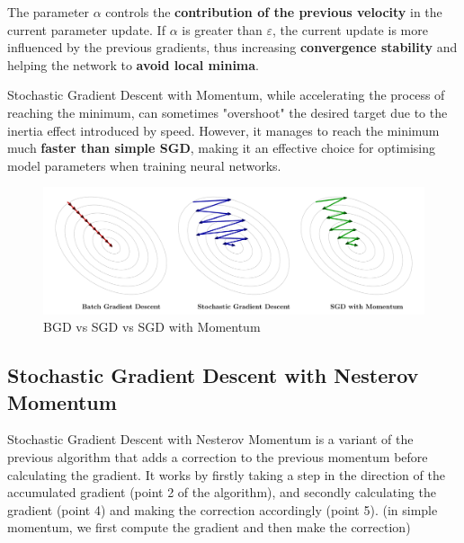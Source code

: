 The parameter \(\alpha\) controls the \textbf{\textcolor{mybluee}{contribution of the previous velocity}} in the current parameter update. If \(\alpha\) is greater than \(\varepsilon\), the current update is more influenced by the previous gradients, thus increasing \textbf{convergence stability} and helping the network to \textbf{avoid local minima}. 

Stochastic Gradient Descent with Momentum, while accelerating the process of reaching the minimum, can sometimes "overshoot" the desired target due to the inertia effect introduced by speed. However, it manages to reach the minimum much \textbf{faster than simple SGD}, making it an effective choice for optimising model parameters when training neural networks.


\begin{figure}[htbp]
\centering
\includegraphics[width=\textwidth]{tikz/chapter3 - BGD vs SGD vs SGD with Momentum.pdf}
\caption{BGD vs SGD vs SGD with Momentum}
\end{figure}

\subsection{Stochastic Gradient Descent with Nesterov Momentum}

Stochastic Gradient Descent with Nesterov Momentum is a variant of the previous algorithm that adds a correction to the previous momentum before calculating the gradient. It works by firstly taking a step in the direction of the accumulated gradient (point 2 of the algorithm), and secondly calculating the gradient (point 4) and making the correction accordingly (point 5). (in simple momentum, we first compute the gradient and then make the correction) 


